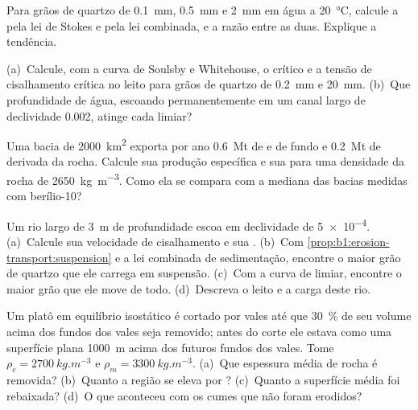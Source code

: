 \begin{exercise}[$\star\star$]\label{exo:b1:erosion-transport:7}
Para grãos de quartzo de \qty{0.1}{mm}, \qty{0.5}{mm} e \qty{2}{mm} em água a \qty{20}{\celsius}, calcule a  pela lei de Stokes e pela lei combinada, e a razão entre as duas. Explique a tendência.
\end{exercise}

\begin{exercise}[$\star\star$]\label{exo:b1:erosion-transport:8}
(a)~Calcule, com a curva de Soulsby e Whitehouse, o  crítico e a tensão de cisalhamento crítica no leito para grãos de quartzo de \qty{0.2}{mm} e
\qty{20}{mm}. (b)~Que profundidade de água, escoando permanentemente em um canal largo de declividade \num{0.002}, atinge cada limiar?
\end{exercise}

\begin{exercise}[$\star\star$]\label{exo:b1:erosion-transport:9}
Uma bacia de \qty{2000}{km^2} exporta por ano \qty{0.6}{Mt} de  e de fundo e \qty{0.2}{Mt} de  derivada da rocha. Calcule sua produção específica e sua  para uma densidade da rocha de
\qty{2650}{kg.m^{-3}}. Como ela se compara com a mediana das bacias medidas com berílio-10?
\end{exercise}

\begin{exercise}[$\star\star\star$]\label{exo:b1:erosion-transport:10}
Um rio largo de \qty{3}{m} de profundidade escoa em declividade de \num{5e-4}. (a)~Calcule sua velocidade de cisalhamento e sua . (b)~Com
\cref{prop:b1:erosion-transport:suspension} e a lei combinada de sedimentação, encontre o maior grão de quartzo que ele carrega em suspensão. (c)~Com a curva de limiar, encontre o maior grão que ele move de todo. (d)~Descreva o leito e a carga deste rio.
\end{exercise}

\begin{exercise}[$\star\star\star$]\label{exo:b1:erosion-transport:11}
Um platô em equilíbrio isostático é cortado por vales até que \qty{30}{\percent} de seu volume acima dos fundos dos vales seja removido; antes do corte ele estava como uma superfície plana \qty{1000}{m} acima dos futuros fundos dos vales. Tome $\rho_c = \qty{2700}{kg.m^{-3}}$ e $\rho_m = \qty{3300}{kg.m^{-3}}$. (a)~Que espessura média de rocha é removida? (b)~Quanto a região se eleva por ? (c)~Quanto a superfície média foi rebaixada? (d)~O que aconteceu com os cumes que não foram erodidos?
\end{exercise}

